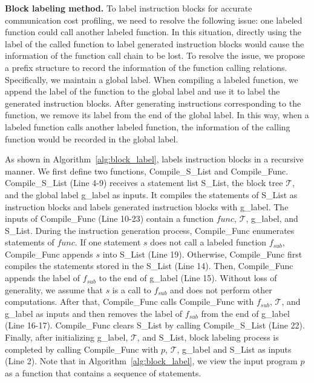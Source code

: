 \noindent\textbf{Block labeling method.} To label instruction blocks for accurate communication cost profiling, we need to resolve the following issue: one labeled function could call another labeled function. In this situation, directly using the label of the called function to label generated instruction blocks would cause the information of the function call chain to be lost.  To resolve the issue, we propose a prefix structure to record the information of the function calling relations. Specifically, we maintain a global label. When compiling a labeled function, we append the label of the function to the global label and use it to label the generated instruction blocks. After generating instructions corresponding to the function, we remove its label from the end of the global label. In this way, when a labeled function calls another labeled function, the information of the calling function would be recorded in the global label. 


As shown in Algorithm~\ref{alg:block_label}, \hawkeye labels instruction blocks in a recursive manner. We first define two functions, Compile\_S\_List and Compile\_Func. Compile\_S\_List (Line 4-9) receives a statement list S\_List, the block tree $\mathcal{T}$, and the global label g\_label as inputs. It compiles the statements of S\_List as instruction blocks and labels generated instruction blocks with g\_label. The inputs of Compile\_Func (Line 10-23) contain a function $func$,  $\mathcal{T}$, g\_label, and S\_List. During the instruction generation process, Compile\_Func enumerates statements of $func$. If one statement $s$ does not call a labeled function $f_{sub}$, Compile\_Func appends $s$ into S\_List (Line 19). Otherwise, Compile\_Func first compiles the statements stored in the S\_List (Line 14). Then, Compile\_Func appends the label of $f_{sub}$ to the end of g\_label (Line 15). Without loss of generality, we assume that $s$ is a call to $f_{sub}$ and does not perform other computations. After that, Compile\_Func calls Compile\_Func with $f_{sub}$, $\mathcal{T}$, and g\_label as inputs and then removes the label of $f_{sub}$ from the end of g\_label (Line 16-17). Compile\_Func clears S\_List by calling Compile\_S\_List (Line 22). Finally, after initializing g\_label, $\mathcal{T}$, and S\_List, block labeling process is completed by calling Compile\_Func with $p$, $\mathcal{T}$, g\_label and S\_List as inputs (Line 2). Note that in Algorithm~\ref{alg:block_label}, we view the input program $p$ as a function that contains a sequence of statements.


